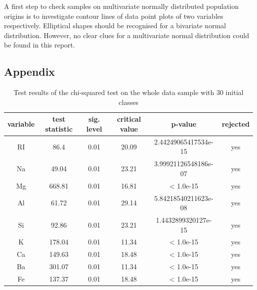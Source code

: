 \documentclass[a4paper, 12pt, titlepage, headsepline, listof = totoc, bibliography = totoc, numbers = noenddot]{scrartcl}
\begin{document}
A first step to check samples on multivariate normally distributed population origins is to investigate contour lines of data point plots of two variables respectively. Elliptical shapes should be recognised for a bivariate normal distribution. However, no clear clues for a multivariate normal distribution could be found in this report.








\newpage

\begin{appendix}



\section{Appendix}

\begin{table}[h!]
\centering
\begin{tabular}{|cccccc|} \hline variable & test statistic & sig. level & critical value & p-value & rejected\\ \hline RI & 86.4 & 0.01 & 20.09 & 2.44249065417534e-15 & yes\\ 
Na & 49.04 & 0.01 & 23.21 & 3.99921126548186e-07 & yes\\ 
Mg & 668.81 & 0.01 & 16.81 & < 1.0e-15 & yes\\ 
Al & 61.72 & 0.01 & 29.14 & 5.84218540211623e-08 & yes\\ 
Si & 92.86 & 0.01 & 23.21 & 1.4432899320127e-15 & yes\\ 
K & 178.04 & 0.01 & 11.34 & < 1.0e-15 & yes\\ 
Ca & 149.63 & 0.01 & 18.48 & < 1.0e-15 & yes\\ 
Ba & 301.07 & 0.01 & 11.34 & < 1.0e-15 & yes\\ 
Fe & 137.37 & 0.01 & 18.48 & < 1.0e-15 & yes\\ \hline \end{tabular}\caption{Test results of the chi-squared test on the whole data sample with 30 initial classes}
\label{tab:chi-full-30}
\end{table}


\end{appendix}
\end{document}
